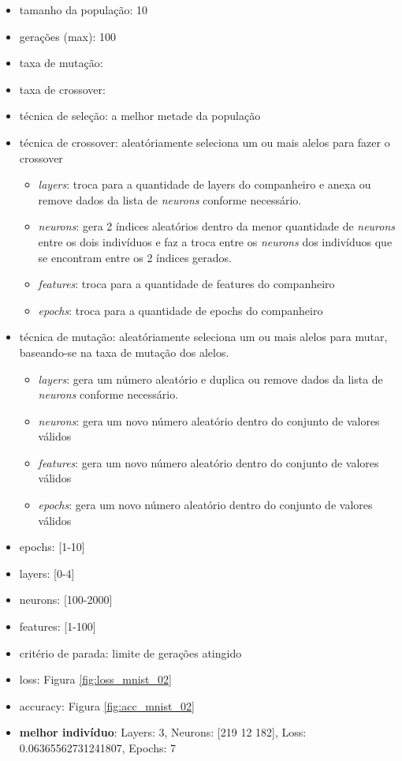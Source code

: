 \documentclass[twoside,conference,a4paper]{IEEEtran}
\begin{document}
\begin{itemize}
    \item tamanho da população: 10
    \item gerações (max): 100
    \item taxa de mutação:
    \item taxa de crossover:
    \item técnica de seleção: a melhor metade da população
    \item técnica de crossover: aleatóriamente seleciona um ou mais alelos para fazer o crossover
    \begin{itemize}
        \item \emph{layers}: troca para a quantidade de layers do companheiro e anexa ou remove dados da lista de \emph{neurons} conforme necessário.
        \item \emph{neurons}: gera 2 índices aleatórios dentro da menor quantidade de \emph{neurons} entre os dois indivíduos e faz a troca entre os \emph{neurons} dos indivíduos que se encontram entre os 2 índices gerados.
        \item \emph{features}: troca para a quantidade de features do companheiro
        \item \emph{epochs}: troca para a quantidade de epochs do companheiro
    \end{itemize}
    \item técnica de mutação: aleatóriamente seleciona um ou mais alelos para mutar, baseando-se na taxa de mutação dos alelos.
    \begin{itemize}
        \item \emph{layers}: gera um número aleatório e duplica ou remove dados da lista de \emph{neurons} conforme necessário.
        \item \emph{neurons}: gera um novo número aleatório dentro do conjunto de valores válidos
        \item \emph{features}: gera um novo número aleatório dentro do conjunto de valores válidos
        \item \emph{epochs}: gera um novo número aleatório dentro do conjunto de valores válidos
    \end{itemize}
    \item epochs: [1-10]
    \item layers: [0-4]
    \item neurons: [100-2000]
    \item features: [1-100]
    \item critério de parada: limite de gerações atingido
    \item loss: Figura \ref{fig:loss_mnist_02}
    \item accuracy: Figura \ref{fig:acc_mnist_02}
    \item \textbf{melhor indivíduo}: Layers: 3, Neurons: [219  12 182], Loss: 0.06365562731241807, Epochs: 7
\end{itemize}
\end{document}
